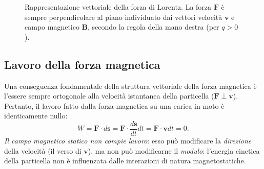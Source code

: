 \documentclass[a4paper,11pt]{report}
\begin{document}
\begin{figure}[htbp]
    \centering
    \caption{Rappresentazione vettoriale della forza di Lorentz. La forza $\bm{F}$ è sempre perpendicolare al piano individuato dai vettori velocità $\bm{v}$ e campo magnetico $\bm{B}$, secondo la regola della mano destra (per $q>0$).}
    \label{fig:regola_mano_destra}
\end{figure}


\subsection{Lavoro della forza magnetica}
Una conseguenza fondamentale della struttura vettoriale della forza magnetica è l'essere sempre ortogonale alla velocità istantanea della particella ($\bm{F} \perp \bm{v}$).
Pertanto, il lavoro fatto dalla forza magnetica su una carica in moto è identicamente nullo:
\begin{equation}
    W = \bm{F} \cdot d\bm{s} = \bm{F} \cdot \frac{d\bm{s}}{dt} dt = \bm{F} \cdot \bm{v} dt = 0.
\end{equation}
\textit{Il campo magnetico statico non compie lavoro}: esso può modificare la \textit{direzione} della velocità (il verso di $\bm{v}$), ma non può modificarne il \textit{modulo}: l'energia cinetica della particella non è influenzata dalle interazioni di natura magnetostatiche.
\end{document}
